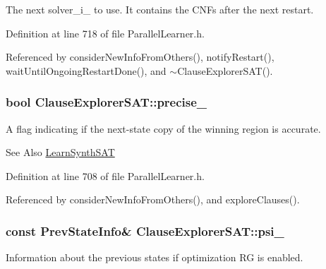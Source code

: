 The next solver\-\_\-i\-\_\- to use. It contains the C\-N\-Fs after the next restart. 



Definition at line 718 of file Parallel\-Learner.\-h.



Referenced by consider\-New\-Info\-From\-Others(), notify\-Restart(), wait\-Until\-Ongoing\-Restart\-Done(), and $\sim$\-Clause\-Explorer\-S\-A\-T().

\hypertarget{classClauseExplorerSAT_a3edc259c6f39cce098ab18a2dce7f262}{
\subsubsection[{precise\-\_\-}]{\setlength{\rightskip}{0pt plus 5cm}bool Clause\-Explorer\-S\-A\-T\-::precise\-\_\-\hspace{0.3cm}{\ttfamily [protected]}}}\label{classClauseExplorerSAT_a3edc259c6f39cce098ab18a2dce7f262}


A flag indicating if the next-\/state copy of the winning region is accurate. 

\begin{DoxySeeAlso}{See Also}
\hyperlink{classLearnSynthSAT}{Learn\-Synth\-S\-A\-T} 
\end{DoxySeeAlso}


Definition at line 708 of file Parallel\-Learner.\-h.



Referenced by consider\-New\-Info\-From\-Others(), and explore\-Clauses().

\hypertarget{classClauseExplorerSAT_a5c9357bf710d59a91086dd0aa2419fe8}{
\subsubsection[{psi\-\_\-}]{\setlength{\rightskip}{0pt plus 5cm}const {\bf Prev\-State\-Info}\& Clause\-Explorer\-S\-A\-T\-::psi\-\_\-\hspace{0.3cm}{\ttfamily [protected]}}}\label{classClauseExplorerSAT_a5c9357bf710d59a91086dd0aa2419fe8}


Information about the previous states if optimization R\-G is enabled. 



